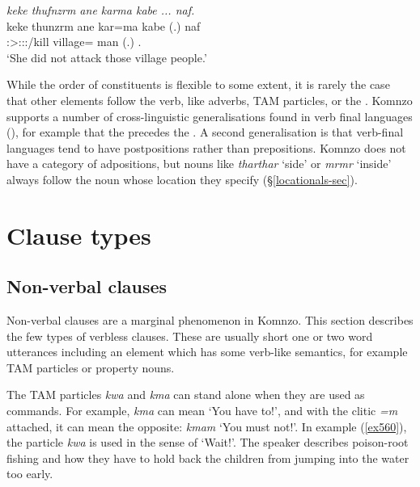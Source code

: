 \begin{exe}
	\ex \emph{keke thufnzrm ane karma kabe ... naf.}\\
	\gll keke thunzrm ane kar=ma kabe (.) naf\\
	{\Neg} \Sg:\Sbj>\Stpl:\Obj:\Pst:\Dur/kill {\Dem} village={\Char} man (.) \Tsg.\Erg\\
	\trans `She did not attack those village people.'
	\label{ex688}
\end{exe}

While the order of constituents is flexible to some extent, it is rarely the case that other elements follow the verb, like adverbs, TAM particles, or the . Komnzo supports a number of cross-linguistic generalisations found in verb final languages (\citealt{Dryer:2007wordorder}), for example that the  precedes the . A second generalisation is that verb-final languages tend to have postpositions rather than prepositions. Komnzo does not have a category of adpositions, but  nouns like \emph{tharthar} `side' or \emph{mrmr} `inside' always follow the noun whose location they specify ({\S}\ref{locationals-sec}).

\section{Clause types}\label{clause types}

\subsection{Non-verbal clauses}\label{nonverbalclauses}

Non-verbal clauses are a marginal phenomenon in Komnzo. This section describes the few types of verbless clauses. These are usually short one or two word utterances including an element which has some verb-like semantics, for example TAM particles or property nouns.

The TAM particles \emph{kwa} {\Fut} and \emph{kma} {\Pot} can stand alone when they are used as commands. For example, \emph{kma} can mean `You have to!', and with the  clitic \emph{=m} attached, it can mean the opposite: \emph{kmam} `You must not!'. In example (\ref{ex560}), the  particle \emph{kwa} is used in the sense of `Wait!'. The speaker describes poison-root fishing and how they have to hold back the children from jumping into the water too early.

